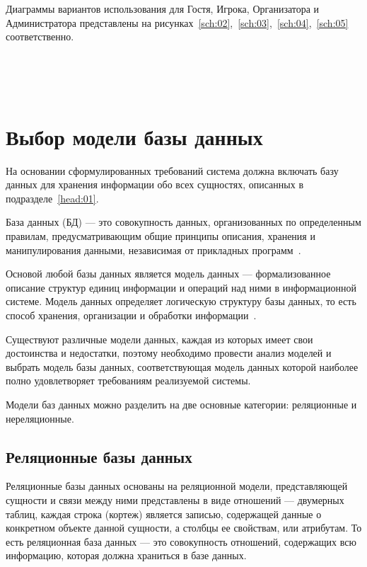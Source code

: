 Диаграммы вариантов использования для Гостя, Игрока, Организатора и
Администратора представлены на
рисунках~\ref{sch:02},~\ref{sch:03},~\ref{sch:04},~\ref{sch:05}
соответственно.


~\\
~\\
~\\
\section{Выбор модели базы данных}

На основании сформулированных требований система должна включать базу данных для
хранения информации обо всех сущностях, описанных в подразделе~\ref{head:01}.

База данных (БД) --- это совокупность данных, организованных по определенным
правилам, предусматривающим общие принципы описания, хранения и манипулирования
данными, независимая от прикладных программ~\cite{gost01}.

Основой любой базы данных является модель данных --- формализованное описание
структур единиц информации и операций над ними в информационной системе.
Модель данных определяет логическую структуру базы данных, то есть
способ хранения, организации и обработки информации~\cite{book01}.

Существуют различные модели данных, каждая из которых имеет свои достоинства и
недостатки, поэтому необходимо провести анализ моделей и выбрать модель базы
данных, соответствующая модель данных которой наиболее полно удовлетворяет
требованиям реализуемой системы.

Модели баз данных можно разделить на две основные категории: реляционные и
нереляционные.

\subsection{Реляционные базы данных}

Реляционные базы данных основаны на реляционной модели, представляющей сущности и
связи между ними представлены в виде отношений --- двумерных таблиц, каждая
строка (кортеж) является записью, содержащей данные о конкретном объекте данной
сущности, а столбцы ее свойствам, или атрибутам. То есть реляционная база
данных --- это совокупность отношений, содержащих всю информацию, которая должна
храниться в базе данных.

